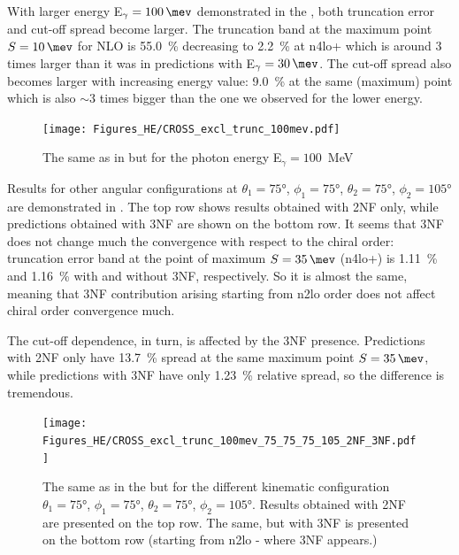     With larger energy E$_\gamma=\SI{100}{\mev}$ demonstrated in the ,
    both truncation error and cut-off spread become larger.
    The truncation band at the maximum point $S=\SI{10}{\mev}$ for NLO is \SI{55.0}{\percent}
    decreasing to \SI{2.2}{\percent} at \gls{n4lo+} which is around 3 times larger than
    it was in predictions with E$_\gamma=\SI{30}{\mev}$.
    The cut-off spread also becomes larger with increasing energy value: \SI{9.0}{\percent}
    at the same (maximum) point which is also $\sim 3$ times bigger than the one we observed
    for the lower energy.

        \begin{figure}[h]
            \begin{center}
            \texttt{[image: Figures\_HE/CROSS\_excl\_trunc\_100mev.pdf]}
            \end{center}
            \caption{The same as in  but 
            for the photon energy E$_\gamma=100$~MeV}
            \label{CROSS_HE_EXCL_100}
        \end{figure}

    Results for other angular configurations at 
    $\theta_1 = \ang{75}$, $\phi_1 = \ang{75}$,
    $\theta_2 = \ang{75}$, $\phi_2 = \ang{105}$ are
    demonstrated in .
    The top row shows results obtained with 2NF only, while predictions obtained with 3NF are shown
    on the bottom row.
    It seems that 3NF does not change much the convergence with respect to the chiral order:
    truncation error band at the point of maximum $S=\SI{35}{\mev}$ (\gls{n4lo+})
    is \SI{1.11}{\percent} and \SI{1.16}{\percent} with and without 3NF, respectively.
    So it is almost the same, meaning that 3NF contribution arising starting from \gls{n2lo} order
    does not affect chiral order convergence much.

    The cut-off dependence, in turn, is affected by the 3NF presence. Predictions with 2NF only have
    \SI{13.7}{\percent} spread at the same maximum point $S=\SI{35}{\mev}$, while predictions with 3NF
    have only \SI{1.23}{\percent} relative spread, so the difference is tremendous.

        \begin{figure}[h]
            \begin{center}
                \texttt{[image: Figures\_HE/CROSS\_excl\_trunc\_100mev\_75\_75\_75\_105\_2NF\_3NF.pdf]}
                \end{center}
                \caption{The same as in the  but for the different kinematic
                configuration
                $\theta_1 = \ang{75}$, $\phi_1 = \ang{75}$,
                $\theta_2 = \ang{75}$, $\phi_2 = \ang{105}$.
                Results obtained with 2NF are presented on the top row. The same, but
                with 3NF is presented on the bottom row (starting from \gls{n2lo} - where 3NF appears.)}
                \label{CROSS_HE_EXCL_75_75_75_105}
        \end{figure}


